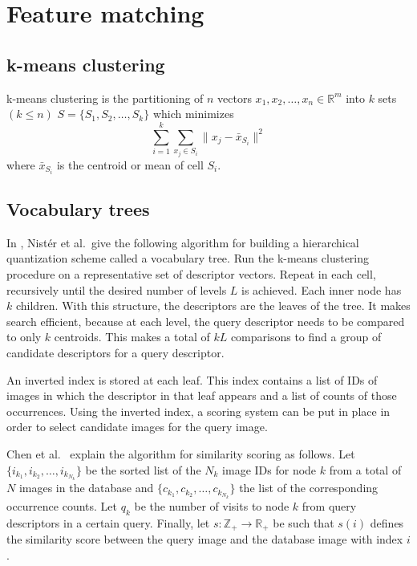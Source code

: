 \section{Feature matching}
\label{sec:feature_matching}

\subsection{k-means clustering}

k-means clustering is the partitioning of $n$ vectors $x_1, x_2, \ldots, x_n \in \mathbb{R}^m$ into $k$ sets $(k \leq n)$ $S = \{S_1,S_2,\ldots,S_k\}$ which minimizes
\begin{equation}
\sum_{i=1}^k \sum_{x_j \in S_i} \|x_j - \bar{x}_{S_i}\|^2
\end{equation}
where $\bar{x}_{S_i}$ is the centroid or mean of cell $S_i$. \cite{kmeans}

\subsection{Vocabulary trees}

In \cite{nister2006scalable}, Nistér et al.\ give the following algorithm for building a hierarchical quantization scheme called a vocabulary tree. Run the k-means clustering procedure on a representative set of descriptor vectors. Repeat in each cell, recursively until the desired number of levels $L$ is achieved. Each inner node has $k$ children. With this structure, the descriptors are the leaves of the tree. It makes search efficient, because at each level, the query descriptor needs to be compared to only $k$ centroids. This makes a total of $kL$ comparisons to find a group of candidate descriptors for a query descriptor.

An inverted index is stored at each leaf. This index contains a list of IDs of images in which the descriptor in that leaf appears and a list of counts of those occurrences. Using the inverted index, a scoring system can be put in place in order to select candidate images for the query image.

Chen et al.\ \cite{chen2010inverted} explain the algorithm for similarity scoring as follows. Let $\{i_{k_1}, i_{k_2}, \ldots, i_{k_{N_k}}\}$ be the sorted list of the $N_k$ image IDs for node $k$ from a total of $N$ images in the database and $\{c_{k_1}, c_{k_2}, \ldots, c_{k_{N_k}}\}$ the list of the corresponding occurrence counts. Let $q_k$ be the number of visits to node $k$ from query descriptors in a certain query. Finally, let $s: \mathbb{Z}_+ \to \mathbb{R}_+$ be such that $s(i)$ defines the similarity score between the query image and the database image with index $i$.

